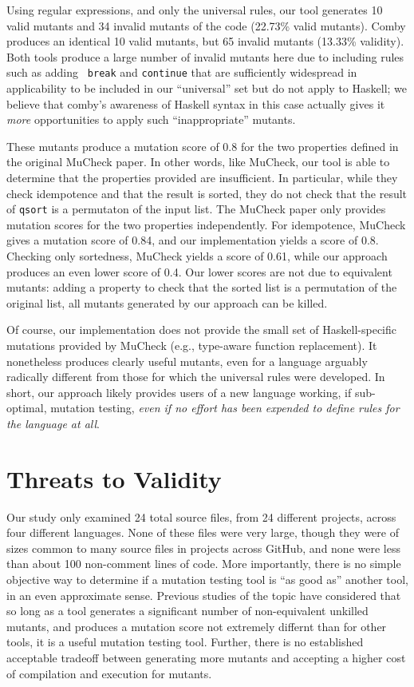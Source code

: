 \documentclass[sigconf,review, anonymous]{acmart}
\begin{document}
Using regular expressions, and only the universal rules, our tool
generates 10 valid mutants and 34 invalid mutants of the code (22.73\%
valid mutants).  Comby produces an identical 10 valid mutants, but 65
invalid mutants (13.33\% validity).  Both tools produce a large number
of invalid mutants here due to including rules such as adding {\tt
  break} and {\tt continue} that are sufficiently widespread in
applicability to be included in our ``universal'' set but do not apply
to Haskell; we believe that comby's awareness of Haskell syntax in
this case actually gives it \emph{more} opportunities to apply such
``inappropriate'' mutants.

These mutants produce a mutation
score of 0.8 for the two properties defined in the original MuCheck
paper.  In other words, like MuCheck, our tool is able to
determine that the properties provided are insufficient.  In
particular, while they check idempotence and that the result is
sorted, they do not check that the result of {\tt qsort} is a permutaton of the input
list.  The MuCheck paper only provides mutation scores for the two
properties independently.  For idempotence, MuCheck gives a mutation
score of 0.84, and our implementation yields a score of 0.8.  Checking
only sortedness, MuCheck yields a score of 0.61, while our approach
produces an even lower score of 0.4.  Our lower
scores are not due to equivalent mutants: adding a property to check
that the sorted list is a permutation of the original list, all
mutants generated by our approach can be killed.

Of course, our implementation does not provide the small set of Haskell-specific
mutations provided by MuCheck (e.g., type-aware function replacement).  It nonetheless produces clearly useful
mutants, even for a language arguably radically different from those
for which the universal rules were developed.  In short, our approach
likely provides users of a new language working, if sub-optimal, mutation testing,
\emph{even if no effort has been expended to define rules for the
  language at all}.

\section{Threats to Validity}

Our study only examined 24 total source files, from 24 different projects, across four different
languages.  None of these files were very large, though they were of
sizes common to many source files in projects across GitHub, and none
were less than about 100 non-comment lines of code.  More importantly,
there is no simple objective way to determine if a mutation testing
tool is ``as good as'' another tool, in an even approximate sense.
Previous studies of the topic have considered that so long as a tool
generates a significant number of non-equivalent unkilled mutants, and
produces a mutation score not extremely differnt than for other tools,
it is a useful mutation testing tool.  Further, there is no
established acceptable tradeoff between generating more mutants and
accepting a higher cost of compilation and execution for mutants.
\end{document}
